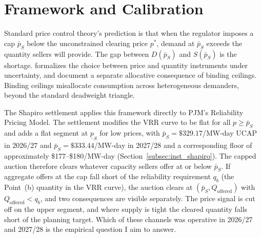 
\section{Framework and Calibration}
\label{sec:theory}
\label{subsec:theory_ceiling}%

Standard price control theory's prediction is that when the regulator imposes a
cap $\bar p_S$ below the unconstrained clearing price $p^*$, demand at
$\bar p_S$ exceeds the quantity sellers will provide. The gap between
$D(\bar p_S)$ and $S(\bar p_S)$ is the shortage.
\citet{Weitzman1974_prices} formalizes the choice between price and
quantity instruments under uncertainty, and
\citet{GlaeserLuttmer2003_rent} document a separate allocative
consequence of binding ceilings. Binding ceilings misallocate
consumption across heterogeneous demanders, beyond the standard
deadweight triangle.

The Shapiro settlement applies this framework directly to PJM's Reliability
Pricing Model. The settlement modifies the VRR
curve to be flat for all $p \geq \bar p_S$ and adds a flat segment at
$\underline p_S$ for low prices, with $\bar p_S = \$329.17$/MW-day UCAP
in 2026/27 and $\bar p_S = \$333.44$/MW-day in 2027/28 and a corresponding
floor of approximately \$177--\$180/MW-day
(Section~\ref{subsec:inst_shapiro}). The capped auction therefore clears
whatever capacity sellers offer at or below $\bar p_S$. If aggregate
offers at the cap fall short of the reliability requirement $q_b$ (the
Point~(b) quantity in the VRR curve), the auction clears at
$(\bar p_S, Q_{\text{offered}})$ with $Q_{\text{offered}} < q_b$, and
two consequences are visible separately. The price signal is cut off
on the upper segment, and where supply is tight the cleared quantity
falls short of the planning target. Which of these channels was
operative in 2026/27 and 2027/28 is the empirical question I aim to answer.

